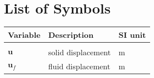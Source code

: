 \documentclass{Configuration_Files/PoliMi3i_thesis}
\let\cleardoublepage\clearpage
\begin{document}
\chapter*{List of Symbols} %
\begin{table}[H]
    \centering
    \begin{tabular}{lll}
        \textbf{Variable} & \textbf{Description} & \textbf{SI unit} \\\hline\\[-9px]
        $\bm{u}$ & solid displacement & m \\[2px]
        $\bm{u}_f$ & fluid displacement & m \\[2px]
    \end{tabular}
\end{table}

\cleardoublepage
\end{document}
